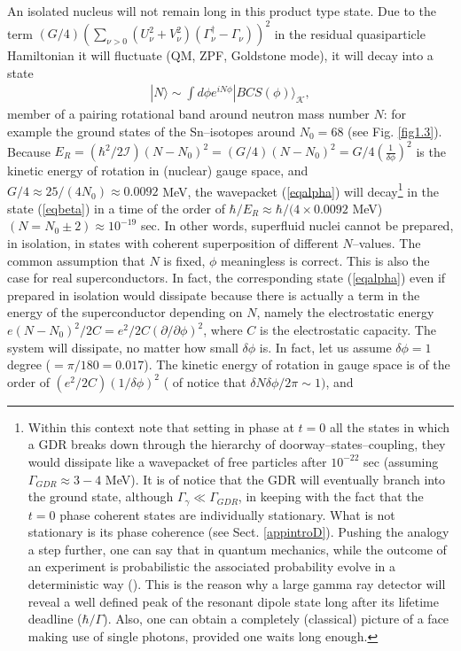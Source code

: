 An isolated nucleus will not remain long in this product type state. Due to the term $(G/4)\left(\sum_{\nu>0}\left(U^2_\nu+V^2_\nu\right)\left(\Gamma_\nu^\dagger-\Gamma_\nu\right)\right)^2$ in the residual quasiparticle Hamiltonian it will fluctuate (QM, ZPF, Goldstone mode), it will decay into a state
\begin{align}\label{eqbeta}
|N\rangle \sim \int d\phi e^{iN\phi}|BCS(\phi)\rangle_{\mathcal{K}},
\end{align}
member of a pairing rotational band around neutron mass number $N$: for example the ground states of the Sn--isotopes around $N_0=68$ (see Fig. \ref{fig1.3}). Because $E_R=(\hbar^2/2\mathcal I)(N-N_0)^2=(G/4)(N-N_0)^2=G/4(\tfrac{1}{\delta \phi})^2$ is the kinetic energy of rotation in (nuclear) gauge space, and $G/4\approx 25/(4 N_0)\approx 0.0092$ MeV, the wavepacket (\ref{eqalpha}) will decay\footnote{Within this context note that setting in phase at $t=0$ all the states in which a GDR breaks down through the hierarchy of doorway--states--coupling, they would dissipate like a wavepacket of free particles after $10^{-22}$ sec (assuming $\Gamma_{GDR}\approx 3-4$ MeV). It is of notice that the GDR will eventually branch into the ground state, although $\Gamma_{\gamma}\ll\Gamma_{GDR}$, in keeping with the fact that the $t=0$ phase coherent states are individually stationary. What is not stationary is its phase coherence (see Sect. \ref{appintroD}). Pushing the analogy a step further, one can say that in quantum mechanics, while the outcome of an experiment is probabilistic the associated probability evolve in a deterministic way (\cite{Born:26}). This is the reason why a large gamma ray detector will reveal a well defined peak of the resonant dipole state long after its  lifetime deadline ($\hbar/\Gamma$). Also, one can obtain a completely (classical) picture of a face making use of single photons, provided one waits long enough.} in the state (\ref{eqbeta}) in a time of the order of $\hbar/E_R\approx\hbar/(4\times 0.0092$ MeV) $(N=N_0\pm2)\approx 10^{-19}$ sec. In other words, superfluid nuclei cannot be prepared, in isolation, in states with coherent superposition of different $N$--values. The common assumption that $N$ is fixed, $\phi$ meaningless is correct. This is also the case for real superconductors. In fact, the corresponding state (\ref{eqalpha}) even if prepared in isolation would dissipate because there is actually a term in the energy of the superconductor depending on $N$, namely the electrostatic energy $e(N-N_0)^2/2C=e^2/2C(\partial/\partial \phi)^2$, where $C$ is the electrostatic capacity. The system will dissipate, no matter how small $\delta \phi$ is. In fact, let us assume $\delta \phi=1$ degree ($=\pi/180=0.017$). The kinetic energy of rotation in gauge space is of the order of $ (e^2/2C)(1/\delta\phi)^2$  ( of notice that $\delta N\delta\phi/2\pi\sim 1)$, and 
